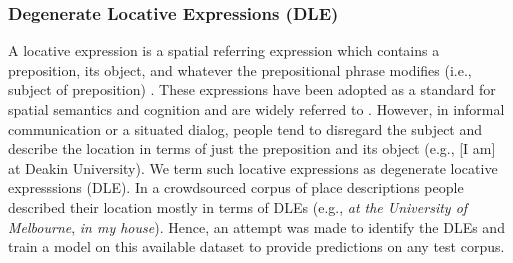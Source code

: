 \documentclass{sig-alternate}
\begin{document}
\subsubsection{Degenerate Locative Expressions (DLE)}
\label{DLE}
A locative expression is a spatial referring expression which contains a preposition, its object, and whatever the prepositional phrase modifies (i.e., subject of preposition) \cite{herskovits:pragmatics}. These expressions have been adopted as a standard for spatial semantics and cognition and are widely referred to \cite{olivier:semantics,zlatev:semantics}. However, in informal communication or a situated dialog, people tend to disregard the subject and describe the location in terms of just the preposition and its object (e.g., [I am] at Deakin University). We term such locative expressions as degenerate locative expresssions (DLE). In a crowdsourced corpus of place descriptions
\cite{tuw}
people described their location mostly in terms of DLEs (e.g., \textit{at the University of Melbourne}, \textit{in my house}). Hence, an attempt was made to identify the DLEs and train a model on this available dataset to provide predictions on any test corpus.
\end{document}
